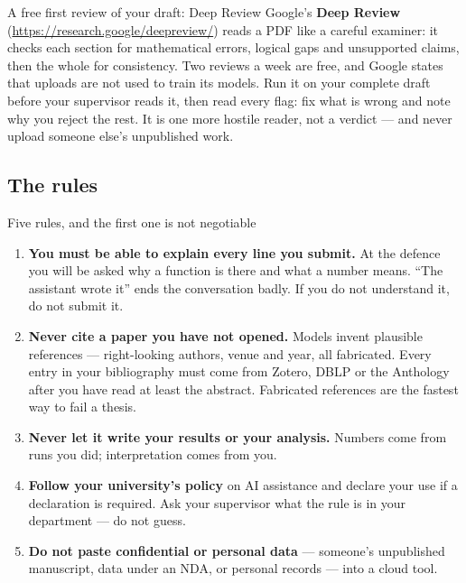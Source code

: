 \documentclass[11pt,a4paper]{article}
\begin{document}
\begin{cbox}{A free first review of your draft: Deep Review}
Google's \textbf{Deep Review} (\url{https://research.google/deepreview/}) reads a PDF
like a careful examiner: it checks each section for mathematical errors,
logical gaps and unsupported claims, then the whole for consistency. Two
reviews a week are free, and Google states that uploads are not used to train
its models. Run it on your complete draft before your supervisor reads it,
then read every flag: fix what is wrong and note why you reject the rest. It
is one more hostile reader, not a verdict --- and never upload someone else's
unpublished work.
\end{cbox}

\subsection{The rules}

\begin{wbox}{Five rules, and the first one is not negotiable}
\begin{enumerate}
  \item \textbf{You must be able to explain every line you submit.} At the
        defence you will be asked why a function is there and what a number
        means. ``The assistant wrote it'' ends the conversation badly. If you
        do not understand it, do not submit it.
  \item \textbf{Never cite a paper you have not opened.} Models invent
        plausible references --- right-looking authors, venue and year, all
        fabricated. Every entry in your bibliography must come from Zotero,
        DBLP or the Anthology after you have read at least the abstract.
        Fabricated references are the fastest way to fail a thesis.
  \item \textbf{Never let it write your results or your analysis.} Numbers
        come from runs you did; interpretation comes from you.
  \item \textbf{Follow your university's policy} on AI assistance and declare
        your use if a declaration is required. Ask your supervisor what the
        rule is in your department --- do not guess.
  \item \textbf{Do not paste confidential or personal data} --- someone's
        unpublished manuscript, data under an NDA, or personal records ---
        into a cloud tool.
\end{enumerate}
\end{wbox}
\end{document}
